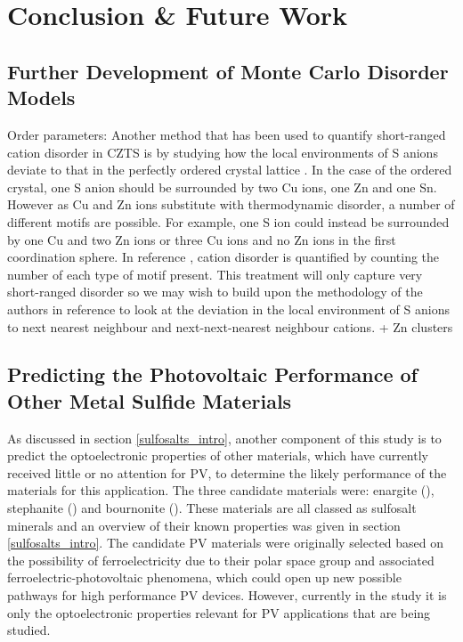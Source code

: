 
\chapter{Conclusion \& Future Work}
\label{ch:conclusions}

\section{Further Development of Monte Carlo Disorder Models}\label{eris_future_work}


Order parameters:
Another method that has been used to quantify short-ranged cation disorder in CZTS is by studying how the local environments of S anions deviate to that in the perfectly ordered crystal lattice \cite{Lany_CZTS}. In the case of the ordered crystal, one S anion should be surrounded by two Cu ions, one Zn and one Sn. However as Cu and Zn ions substitute with thermodynamic disorder, a number of different motifs are possible. For example, one S ion could instead be surrounded by one Cu and two Zn ions or three Cu ions and no Zn ions in the first coordination sphere. In reference , cation disorder is quantified by counting the number of each type of motif present.
This treatment will only capture very short-ranged disorder so we may wish to build upon the methodology of the authors in reference  to look at the deviation in the local environment of S anions to next nearest neighbour and next-next-nearest neighbour cations.
+ 
Zn clusters


\section{Predicting the Photovoltaic Performance of Other Metal Sulfide Materials}\label{sulfosalts_proj}
As discussed in section \ref{sulfosalts_intro}, another component of this study is to predict the optoelectronic properties of other materials, which have currently received little or no attention for PV, to determine the likely performance of the materials for this application. The three candidate materials were: enargite ({\enargite}), stephanite ({\stephanite}) and bournonite ({\bournonite}). These materials are all classed as sulfosalt minerals and an overview of their known properties was given in section \ref{sulfosalts_intro}. The candidate PV materials were originally selected based on the possibility of ferroelectricity due to their polar space group and associated ferroelectric-photovoltaic phenomena, which could open up new possible pathways for high performance PV devices. However, currently in the study it is only the optoelectronic properties relevant for PV applications that are being studied.

